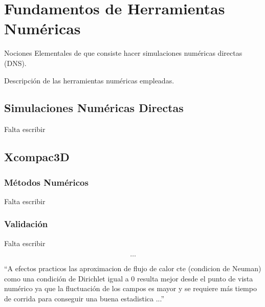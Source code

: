 \chapter{Fundamentos de Herramientas Numéricas}


Nociones Elementales de que consiste hacer simulaciones numéricas directas (DNS).

Descripción de las herramientas numéricas empleadas.


\newpage

\section{Simulaciones Numéricas Directas}

Falta escribir

\section{Xcompac3D}



\subsection{Métodos Numéricos}
Falta escribir

\subsection{Validación}
Falta escribir

$$\dots$$

``A efectos practicos las aproximacion de flujo de calor cte (condicion de Neuman) como una condición de Dirichlet igual a 0 resulta mejor desde el punto de vista numérico ya que la fluctuación de los campos es mayor y se requiere más tiempo de corrida para conseguir una buena estadistica ...''

